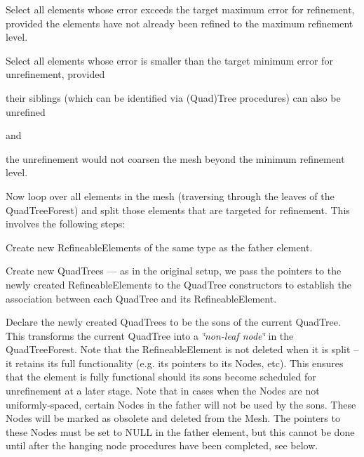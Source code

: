 \begin{DoxyItemize}
\item Select all elements whose error exceeds the target maximum error for refinement, provided the elements have not already been refined to the maximum refinement level.
\item Select all elements whose error is smaller than the target minimum error for unrefinement, provided
\begin{DoxyItemize}
\item their siblings (which can be identified via (Quad)Tree procedures) can also be unrefined
\end{DoxyItemize}and
\begin{DoxyItemize}
\item the unrefinement would not coarsen the mesh beyond the minimum refinement level.
\end{DoxyItemize}
\item Now loop over all elements in the mesh (traversing through the leaves of the {\ttfamily Quad\+Tree\+Forest}) and split those elements that are targeted for refinement. This involves the following steps\+:
\begin{DoxyItemize}
\item Create new {\ttfamily Refineable\+Elements} of the same type as the father element.
\item Create new {\ttfamily Quad\+Trees} --- as in the original setup, we pass the pointers to the newly created {\ttfamily Refineable\+Elements} to the {\ttfamily Quad\+Tree} constructors to establish the association between each {\ttfamily Quad\+Tree} and its {\ttfamily Refineable\+Element}.
\item Declare the newly created {\ttfamily Quad\+Trees} to be the sons of the current {\ttfamily Quad\+Tree}. This transforms the current {\ttfamily Quad\+Tree} into a {\itshape \char`\"{}non-\/leaf node\char`\"{}} in the {\ttfamily Quad\+Tree\+Forest}. Note that the {\ttfamily Refineable\+Element} is not deleted when it is split -- it retains its full functionality (e.\+g. its pointers to its {\ttfamily Nodes}, etc). This ensures that the element is fully functional should its sons become scheduled for unrefinement at a later stage. Note that in cases when the {\ttfamily Nodes} are not uniformly-\/spaced, certain {\ttfamily Nodes} in the father will not be used by the sons. These {\ttfamily Nodes} will be marked as obsolete and deleted from the {\ttfamily Mesh}. The pointers to these {\ttfamily Nodes} must be set to N\+U\+LL in the father element, but this cannot be done until after the hanging node procedures have been completed, see below.

\end{DoxyItemize}
\end{DoxyItemize}
